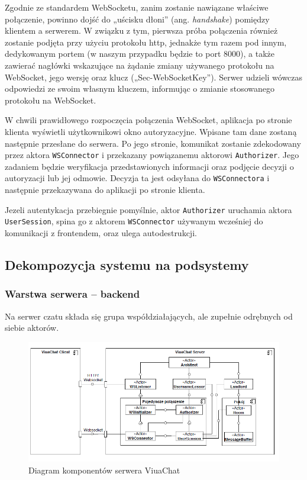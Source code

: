 Zgodnie ze standardem WebSocketu, zanim zostanie nawiązane właściwe połączenie,
powinno dojść do „uścisku dłoni” (ang. \textit{handshake}) pomiędzy klientem a
serwerem. W związku z tym, pierwsza próba połączenia również zostanie podjęta
przy użyciu protokołu http, jednakże tym razem pod innym, dedykowanym portem
(w naszym przypadku będzie to port 8000), a także zawierać nagłówki wskazujące
na żądanie zmiany używanego protokołu na WebSocket, jego wersję oraz klucz
(„Sec-WebSocketKey”). Serwer udzieli wówczas odpowiedzi ze swoim własnym
kluczem, informując o zmianie stosowanego protokołu na WebSocket.

W chwili prawidłowego rozpoczęcia połączenia WebSocket, aplikacja po stronie
klienta wyświetli użytkownikowi okno autoryzacyjne. Wpisane tam dane zostaną
następnie przesłane do serwera. Po jego stronie, komunikat zostanie zdekodowany
przez aktora \texttt{WSConnector} i przekazany powiązanemu aktorowi
\texttt{Authorizer}. Jego zadaniem będzie weryfikacja przedstawionych informacji
oraz podjęcie decyzji o autoryzacji lub jej odmowie. Decyzja ta jest odsyłana do
\texttt{WSConnectora} i następnie przekazywana do aplikacji po stronie klienta.

Jezeli autentykacja przebiegnie pomyślnie, aktor \texttt{Authorizer} uruchamia
aktora \texttt{UserSession}, spina go z aktorem \texttt{WSConnector} używanym
wcześniej do komunikacji z frontendem, oraz ulega autodestrukcji.

\newpage

\subsection{Dekompozycja systemu na podsystemy}
\label{architektura_chatu}

\subsubsection{Warstwa serwera -- backend}
Na serwer czatu składa się grupa współdziałających, ale zupełnie odrębnych od siebie aktorów.

\begin{figure}[!htp]
	\centering
	\includegraphics[width=\textwidth]{chat/fig/pck-diag}
	\caption{Diagram komponentów serwera ViuaChat}
	\label{diag-komp}
\end{figure}

